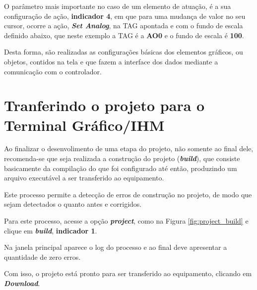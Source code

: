 O parâmetro mais importante no caso de um elemento de atuação, 
é a sua configuração de ação,
\textbf{indicador 4},
em que para uma mudança de valor no seu cursor, 
ocorre a ação, 
\textbf{\textit{Set Analog}}, 
na TAG apontada e com o fundo de escala definido abaixo, 
que neste exemplo a TAG é a \textbf{AO0} 
e o fundo de escala é \textbf{100}. 


Desta forma, 
são realizadas as configurações básicas dos elementos gráficos, 
ou objetos, contidos na tela e que fazem 
a interface dos dados mediante a comunicação com o controlador.





\section{Tranferindo o projeto para o Terminal Gráfico/IHM}


Ao finalizar o desenvolimento de uma etapa do projeto, 
não somente ao final dele, 
recomenda-se que seja realizada a construção do projeto 
(\textbf{\textit{build}}), 
que consiste basicamente da compilação do que foi configurado até então, 
produzindo um arquivo executável a ser transferido ao equipamento. 

Este processo permite 
a detecção de erros de construção no projeto, 
de modo que sejam detectados o quanto antes e corrigidos.

Para este processo, 
acesse a opção \textbf{\textit{project}}, 
como na Figura \ref{fig:project_build} e 
clique em \textbf{\textit{build}},
\textbf{indicador 1}.



\begin{figure}[ht!]
	\centering
\end{figure}



Na janela principal aparece o log do processo e 
ao final deve apresentar a quantidade de zero erros. 


Com isso, 
o projeto está pronto para ser transferido ao equipamento, 
clicando em \textbf{\textit{Download}}. 


